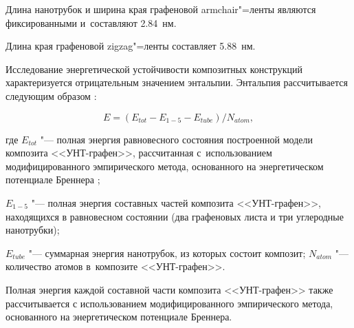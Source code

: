 









Длина нанотрубок и ширина края графеновой armchair"=ленты   являются фиксированными и~составляют 2.84~нм. 

Длина края графеновой zigzag"=ленты  составляет 5.88~нм. 

Исследование энергетической устойчивости композитных конструкций характеризуется отрицательным значением энтальпии. Энтальпия рассчитывается следующим образом \cite{kol:bib18}:

\begin{equation}

\label{kol:1}

 E=(E_{tot}-E_{1-5}-E_{tube})/N_{atom},%

\end{equation}

где $E_{tot}$ "--- полная энергия равновесного состояния построенной модели композита <<УНТ-графен>>, рассчитанная с~использованием модифицированного эмпирического метода, основанного на энергетическом потенциале Бреннера \cite{kol:bib13}; 

$E_{1-5}$ "--- полная энергия составных частей композита <<УНТ-графен>>, находящихся в равновесном состоянии (два графеновых листа и три углеродные нанотрубки); 

$E_{tube}$ "--- суммарная энергия нанотрубок, из которых состоит композит; $N_{atom}$ "--- количество атомов в~композите <<УНТ-графен>>. 

Полная энергия каждой составной части композита <<УНТ-графен>> также рассчитывается с использованием модифицированного эмпирического метода, основанного на энергетическом потенциале Бреннера. 



\smallskip



